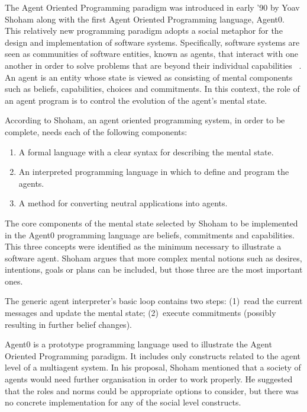 \documentclass[a4paper,12pt,oneside,fleqn]{book} %
\begin{document}
The Agent Oriented Programming paradigm was introduced in early '90 by Yoav
Shoham along with the first Agent Oriented Programming language, Agent0.
This relatively new programming paradigm adopts a social metaphor for the
design and implementation of software systems. Specifically, software
systems are seen as communities of software entities, known as agents, that
interact with one another in order to solve problems that are beyond their
individual capabilities ~\cite{DBLP:journals/ai/Shoham93}. An agent
is an entity whose state is viewed as consisting of mental components such
as beliefs, capabilities, choices and commitments. In this context, the role
of an agent program is to control the evolution of the agent's mental
state.

According to Shoham, an agent oriented programming system, in order to be
complete, needs each of the following components:
\begin{enumerate}
   \item A formal language with a clear syntax for describing the mental state.
   \item An interpreted programming language in which to define and program the agents.
   \item A method for converting neutral applications into agents.
\end{enumerate}

The core components of the mental state selected by Shoham to be
implemented in the Agent0 programming language are beliefs, commitments and
capabilities. This three concepts were identified as the minimum necessary
to illustrate a software agent. Shoham argues that more complex mental
notions such as desires, intentions, goals or plans can be included, but
those three are the most important ones.

The generic agent interpreter's basic loop contains two steps: (1)~read
the current messages and update the mental state; (2)~execute commitments
(possibly resulting in further belief changes).

Agent0 is a prototype programming language used to illustrate the Agent
Oriented Programming paradigm. It includes only constructs related to the
agent level of a multiagent system. In his proposal, Shoham mentioned that
a society of agents would need further organisation in order to work
properly. He suggested that the roles and norms could be appropriate
options to consider, but there was no concrete implementation for any of
the social level constructs.
\end{document}
